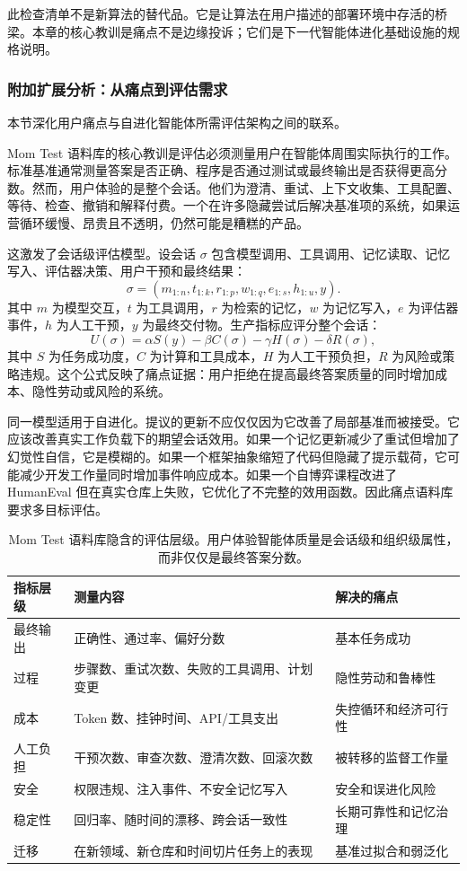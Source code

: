 此检查清单不是新算法的替代品。它是让算法在用户描述的部署环境中存活的桥梁。本章的核心教训是痛点不是边缘投诉；它们是下一代智能体进化基础设施的规格说明。

\subsubsection{附加扩展分析：从痛点到评估需求}
\label{sec:ch7-additional-evaluation-requirements}

本节深化用户痛点与自进化智能体所需评估架构之间的联系。

Mom Test 语料库的核心教训是评估必须测量用户在智能体周围实际执行的工作。标准基准通常测量答案是否正确、程序是否通过测试或最终输出是否获得更高分数。然而，用户体验的是整个会话。他们为澄清、重试、上下文收集、工具配置、等待、检查、撤销和解释付费。一个在许多隐藏尝试后解决基准项的系统，如果运营循环缓慢、昂贵且不透明，仍然可能是糟糕的产品。

这激发了会话级评估模型。设会话 $\sigma$ 包含模型调用、工具调用、记忆读取、记忆写入、评估器决策、用户干预和最终结果：
\[
  \sigma = (m_{1:n}, t_{1:k}, r_{1:p}, w_{1:q}, e_{1:s}, h_{1:u}, y).
\]
其中 $m$ 为模型交互，$t$ 为工具调用，$r$ 为检索的记忆，$w$ 为记忆写入，$e$ 为评估器事件，$h$ 为人工干预，$y$ 为最终交付物。生产指标应评分整个会话：
\[
  U(\sigma)=\alpha S(y)-\beta C(\sigma)-\gamma H(\sigma)-\delta R(\sigma),
\]
其中 $S$ 为任务成功度，$C$ 为计算和工具成本，$H$ 为人工干预负担，$R$ 为风险或策略违规。这个公式反映了痛点证据：用户拒绝在提高最终答案质量的同时增加成本、隐性劳动或风险的系统。

同一模型适用于自进化。提议的更新不应仅仅因为它改善了局部基准而被接受。它应该改善真实工作负载下的期望会话效用。如果一个记忆更新减少了重试但增加了幻觉性自信，它是模糊的。如果一个框架抽象缩短了代码但隐藏了提示载荷，它可能减少开发工作量同时增加事件响应成本。如果一个自博弈课程改进了 HumanEval 但在真实仓库上失败，它优化了不完整的效用函数。因此痛点语料库要求多目标评估。

\begin{table}[htbp]
\centering
\small
\begin{tabular}{p{}p{}p{}}
\toprule
\textbf{指标层级} & \textbf{测量内容} & \textbf{解决的痛点} \\
\midrule
最终输出 & 正确性、通过率、偏好分数 & 基本任务成功 \\
过程 & 步骤数、重试次数、失败的工具调用、计划变更 & 隐性劳动和鲁棒性 \\
成本 & Token 数、挂钟时间、API/工具支出 & 失控循环和经济可行性 \\
人工负担 & 干预次数、审查次数、澄清次数、回滚次数 & 被转移的监督工作量 \\
安全 & 权限违规、注入事件、不安全记忆写入 & 安全和误进化风险 \\
稳定性 & 回归率、随时间的漂移、跨会话一致性 & 长期可靠性和记忆治理 \\
迁移 & 在新领域、新仓库和时间切片任务上的表现 & 基准过拟合和弱泛化 \\
\bottomrule
\end{tabular}
\caption{Mom Test 语料库隐含的评估层级。用户体验智能体质量是会话级和组织级属性，而非仅仅是最终答案分数。}
\label{tab:ch7-evaluation-layers}
\end{table}

